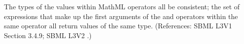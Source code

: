The types of the values within MathML  operators  all
be consistent; \ie the set of expressions that make up the first
arguments of the  and  operators within the
same  operator  all return values of the same type.
(References: SBML L3V1 Section 3.4.9; SBML L3V2 .)
